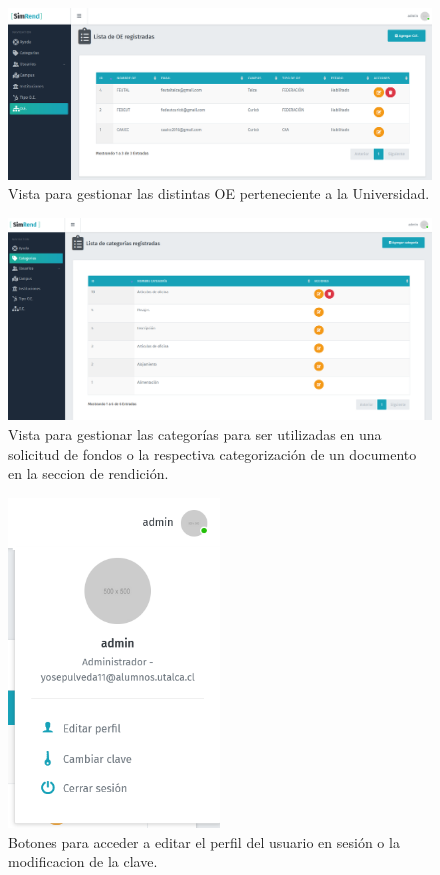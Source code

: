 \begin{figure}[h]
    \centering
    \includegraphics[width=1\textwidth]{Imagenes/CRUDOE.PNG}
    \caption{\label{fig: CRUDOE}Vista para gestionar las distintas OE perteneciente a la Universidad.}
\end{figure}

\begin{figure}[h]
    \centering
    \includegraphics[width=1\textwidth]{Imagenes/CRUDCategoria.PNG}
    \caption{\label{fig: CRUDCategoria}Vista para gestionar las categorías para ser utilizadas en una solicitud de fondos o la respectiva categorización de un documento en la seccion de rendición.}
\end{figure}

\begin{figure}[h]
    \centering
    \includegraphics[width=0.5\textwidth]{Imagenes/EditarPerfilClave.PNG}
    \caption{\label{fig: EditarPerfilClave}Botones para acceder a editar el perfil del usuario en sesión o la modificacion de la clave.}
\end{figure}

